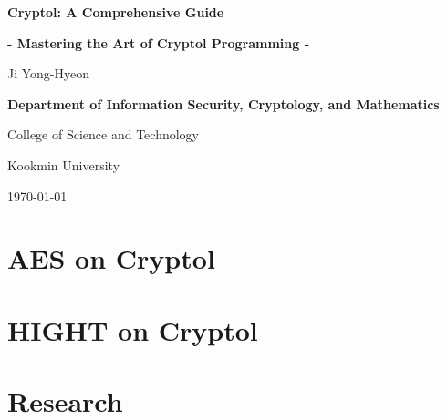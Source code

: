 \documentclass[12pt,openany]{book}
\begin{document}
	
	\begin{titlepage}
		\begin{center}
			{\Huge\textsf{\textbf{Cryptol: A Comprehensive Guide}}\par}
			{\Large\textsf{\textbf{- Mastering the Art of Cryptol Programming -}}\par}
			\vspace{0.5in}
			{\Large {Ji Yong-Hyeon}\par}
			\vspace{1in}
			\vspace{1in}
			{\large\bf \textsf{Department of Information Security, Cryptology, and Mathematics}\par}
			{\textsf{College of Science and Technology}\par}
			{\textsf{Kookmin University}\par}
			\vspace{.25in}
			{\large \textsf{\today}\par}
		\end{center}
	\end{titlepage}
	
	\frontmatter
	
%	
	
	\newpage
	\tableofcontents
	
	\newpage
	\mainmatter
	
	\chapter{AES on Cryptol}
	
	\chapter{HIGHT on Cryptol}
	
	
	\newpage\chapter{Research}
	
	
%	
%	
	
	\appendix
%	
%	
%	
	
	\backmatter
	
	
\end{document}
